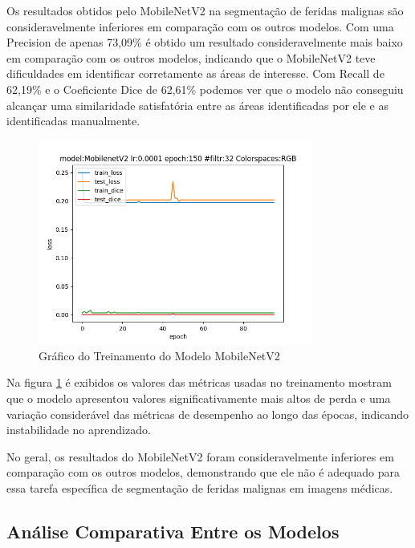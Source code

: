        Os resultados obtidos pelo \ac{MobileNetV2} na segmentação de feridas malignas são consideravelmente inferiores em comparação com os outros modelos. Com uma Precision de apenas 73,09\% é obtido um resultado consideravelmente mais baixo em comparação com os outros modelos, indicando que o \ac{MobileNetV2} teve dificuldades em identificar corretamente as áreas de interesse. Com Recall de 62,19\% e o Coeficiente Dice de 62,61\% podemos ver que o modelo não conseguiu alcançar uma similaridade satisfatória entre as áreas identificadas por ele e as identificadas manualmente.
    
          \begin{figure}[H]
            \centering
            \includegraphics[width=0.8\textwidth]{img/mobilenetv2prunedmodelfile.png}
            \caption{ Gráfico do Treinamento do Modelo \acf{MobileNetV2} }
            \label{fig:graphMobileNetV2}
          \end{figure}

        Na figura \ref{fig:graphMobileNetV2} é exibidos os valores das métricas usadas no treinamento mostram que o modelo apresentou valores significativamente mais altos de perda e uma variação considerável das métricas de desempenho ao longo das épocas, indicando instabilidade no aprendizado.

        No geral, os resultados do \ac{MobileNetV2} foram consideravelmente inferiores em comparação com os outros modelos, demonstrando que ele não é adequado para essa tarefa específica de segmentação de feridas malignas em imagens médicas.
    
\subsection{Análise Comparativa Entre os Modelos}

